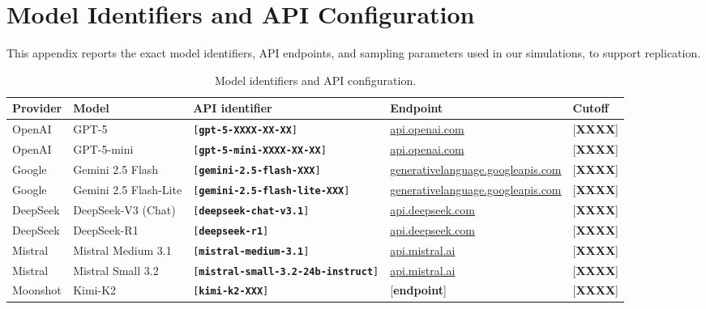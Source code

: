 \documentclass[12pt]{article}
\begin{document}
\section{Model Identifiers and API Configuration}\label{app:model-ids}

This appendix reports the exact model identifiers, API endpoints, and sampling parameters used in our simulations, to support replication.

\begin{table}[h]
    \centering
    \caption{Model identifiers and API configuration.}
    \label{tab:model-ids-detail}
    \begin{threeparttable}
    \footnotesize
    \begin{tabular}{lllll}
        \toprule
        Provider & Model & API identifier & Endpoint & Cutoff \\
        \midrule
        OpenAI    & GPT-5                & \texttt{[\textbf{gpt-5-XXXX-XX-XX}]}                & \url{api.openai.com}     & [\textbf{XXXX}] \\
        OpenAI    & GPT-5-mini           & \texttt{[\textbf{gpt-5-mini-XXXX-XX-XX}]}           & \url{api.openai.com}     & [\textbf{XXXX}] \\
        Google    & Gemini 2.5 Flash     & \texttt{[\textbf{gemini-2.5-flash-XXX}]}            & \url{generativelanguage.googleapis.com} & [\textbf{XXXX}] \\
        Google    & Gemini 2.5 Flash-Lite & \texttt{[\textbf{gemini-2.5-flash-lite-XXX}]}      & \url{generativelanguage.googleapis.com} & [\textbf{XXXX}] \\
        DeepSeek  & DeepSeek-V3 (Chat)   & \texttt{[\textbf{deepseek-chat-v3.1}]}              & \url{api.deepseek.com}   & [\textbf{XXXX}] \\
        DeepSeek  & DeepSeek-R1          & \texttt{[\textbf{deepseek-r1}]}                     & \url{api.deepseek.com}   & [\textbf{XXXX}] \\
        Mistral   & Mistral Medium 3.1   & \texttt{[\textbf{mistral-medium-3.1}]}              & \url{api.mistral.ai}     & [\textbf{XXXX}] \\
        Mistral   & Mistral Small 3.2    & \texttt{[\textbf{mistral-small-3.2-24b-instruct}]}  & \url{api.mistral.ai}     & [\textbf{XXXX}] \\
        Moonshot  & Kimi-K2              & \texttt{[\textbf{kimi-k2-XXX}]}                     & [\textbf{endpoint}]      & [\textbf{XXXX}] \\

\end{tabular}
\end{threeparttable}
\end{table}
\end{document}

